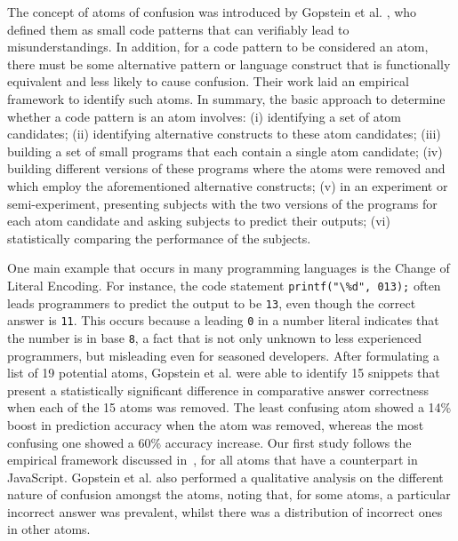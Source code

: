 The concept of atoms of confusion was introduced by Gopstein et al. \cite{DBLP:conf/msr/GopsteinZFC18}, who defined them as small code patterns that can verifiably lead to misunderstandings. In addition, for a code pattern to be considered an atom, there must be some alternative pattern or language construct that is functionally equivalent and less likely to cause confusion. Their work laid an empirical framework to identify such atoms. In summary, the basic approach to determine whether a code pattern is an atom involves: (i) identifying a set of atom candidates; (ii) identifying alternative constructs to these atom candidates; (iii) building a set of small programs that each contain a single atom candidate; (iv) building different versions of these programs where the atoms were removed and which employ the aforementioned alternative constructs; (v) in an experiment or semi-experiment, presenting subjects with the two versions of the programs for each atom candidate and asking subjects to predict their outputs; (vi) statistically comparing the performance of the subjects.

One main example that occurs in many programming languages is the Change of Literal Encoding. For instance, the \clang code statement \lstinline{printf("\%d", 013);} 
often leads programmers to predict the output to be \texttt{13}, even though the correct answer is \texttt{11}. This occurs because a leading \texttt{0} in a number literal indicates that the number is in base \texttt{8}, a fact that is not only unknown to less experienced programmers, but misleading even for seasoned developers. After formulating a list of 19 potential atoms, Gopstein et al. \cite{DBLP:conf/sigsoft/GopsteinIYDZYC17} were able to identify 15 snippets that present a statistically significant difference in comparative answer correctness when each of the 15 atoms was removed. The least confusing atom showed a 14\% boost in prediction accuracy when the atom was removed, whereas the most confusing one showed a 60\% accuracy increase. Our first study follows the empirical framework discussed in~\cite{DBLP:conf/sigsoft/GopsteinIYDZYC17}, for all atoms that have a counterpart in JavaScript. Gopstein et al. \cite{DBLP:conf/msr/GopsteinZFC18} also performed a qualitative analysis on the different nature of confusion amongst the atoms, noting that, for some atoms, a particular incorrect answer was prevalent, whilst there was a distribution of incorrect ones in other atoms. 

